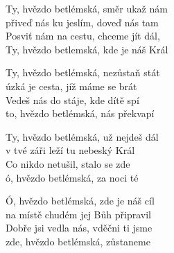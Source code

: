 
\ve{}
Ty, hvězdo betlémská, směr ukaž nám\\
přiveď nás ku jeslím, doveď nás tam\\
Posviť nám na cestu, chceme jít dál, \\ 
Ty, hvězdo betlemská, kde je náš Král

\ve{}
Ty, hvězdo betlémská, nezůstaň stát\\
úzká je cesta, jíž máme se brát\\
Vedeš nás do stáje, kde dítě spí\\
to, hvězdo betlémská, nás překvapí

\ve{}
Ty, hvězdo betlémská, už nejdeš dál\\
v tvé záři leží tu nebeský Král\\
Co nikdo netušil, stalo se zde\\
ó, hvězdo betlémská, za noci té

\ve{}
Ó, hvězdo betlémská, zde je náš cíl\\
na místě chudém jej Bůh připravil\\
Dobře jsi vedla nás, vděčni ti jsme\\
zde, hvězdo betlémská, zůstaneme

\esong{}



